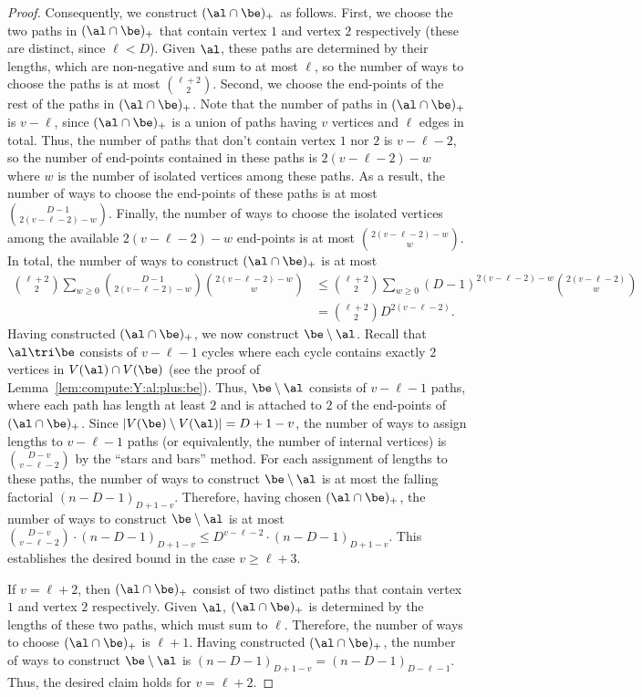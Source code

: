 \documentclass[11pt]{article}
\begin{document}
\begin{proof}
Consequently, we construct $(\al\cap\be)_{+}$ as follows. First, we choose the two paths in $(\al\cap\be)_{+}$ that contain vertex $1$ and vertex $2$ respectively (these are distinct, since $\ell < D$). Given $\al$, these paths are determined by their lengths, which are non-negative and sum to at most $\ell$, so the number of ways to choose the paths is at most $\binom{\ell+2}{2}$. Second, we choose the end-points of the rest of the paths in $(\al\cap\be)_{+}$. Note that the number of paths in $(\al\cap\be)_{+}$ is $v-\ell$, since $(\al\cap\be)_{+}$ is a union of paths having $v$ vertices and $\ell$ edges in total. Thus, the number of paths that don't contain vertex $1$ nor $2$ is $v-\ell-2$, so the number of end-points contained in these paths is $2(v-\ell-2)-w$ where $w$ is the number of isolated vertices among these paths. As a result, the number of ways to choose the end-points of these paths is at most $\binom{D-1}{2(v-\ell-2)-w}$. Finally, the number of ways to choose the isolated vertices among the available $2(v-\ell-2)-w$ end-points is at most $\binom{2(v-\ell-2)-w}{w}$. In total, the number of ways to construct $(\al\cap \be)_{+}$ is at most
\[
\begin{split}
\binom{\ell+2}{2}\sum_{w\geq 0}\binom{D-1}{2(v-\ell-2)-w}\binom{2(v-\ell-2)-w}{w}
&\leq \binom{\ell+2}{2}\sum_{w\geq 0}(D-1)^{2(v-\ell-2)-w}\binom{2(v-\ell-2)}{w}\\
&=\binom{\ell+2}{2} D^{2(v-\ell-2)}.
\end{split}
\]
Having constructed $(\al\cap\be)_{+}$, we now construct $\be\setminus \al$. Recall that $\al\tri \be$ consists of $v-\ell-1$ cycles where each cycle contains exactly $2$ vertices in $V(\al)\cap V(\be)$ (see the proof of Lemma~\ref{lem:compute:Y:al:plus:be}). Thus, $\be\setminus \al$ consists of $v-\ell-1$ paths, where each path has length at least $2$ and is attached to $2$ of the end-points of $(\al\cap \be)_{+}$. Since $|V(\be)\setminus V(\al)|=D+1-v$, the number of ways to assign lengths to $v-\ell-1$ paths (or equivalently, the number of internal vertices) is $\binom{D-v}{v-\ell-2}$ by the ``stars and bars'' method. For each assignment of lengths to these paths, the number of ways to construct $\be\setminus \al$ is at most the falling factorial $(n-D-1)_{D+1-v}$. Therefore, having chosen $(\al\cap\be)_{+}$, the number of ways to construct $\be\setminus \al$ is at most $\binom{D-v}{v-\ell-2}\cdot (n-D-1)_{D+1-v}\leq D^{v-\ell-2}\cdot (n-D-1)_{D+1-v}$. This establishes the desired bound in the case $v\geq \ell+3$.


If $v=\ell+2$, then $(\al \cap \be)_{+}$ consist of two distinct paths that contain vertex $1$ and vertex $2$ respectively. Given $\al$, $(\al\cap\be)_{+}$ is determined by the lengths of these two paths, which must sum to $\ell$. Therefore, the number of ways to choose $(\al \cap \be)_{+}$ is $\ell+1$. Having constructed $(\al\cap \be)_{+}$, the number of ways to construct $\be\setminus \al$ is $(n-D-1)_{D+1-v}=(n-D-1)_{D-\ell-1}$. Thus, the desired claim holds for $v=\ell+2$.
\end{proof}
\end{document}
